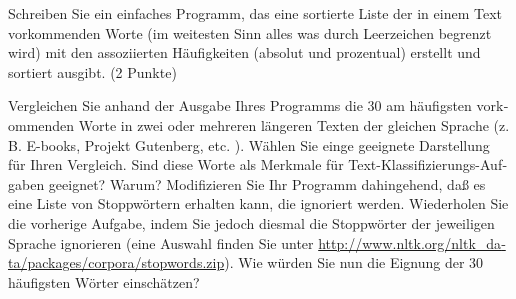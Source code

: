 Schreiben Sie ein ein­fach­es Pro­gramm, das eine sortierte Liste der in einem 
Text vork­om­menden Worte (im weitesten Sinn alles was durch Leerze­ichen 
be­gren­zt wird) mit den as­sozi­ierten Häufigkeit­en (ab­so­lut und 
prozen­tu­al) er­stellt und sortiert ausgibt.​ (2 Punk­te)

    Ver­gle­ichen Sie an­hand der Aus­gabe Ihres Pro­gramms die 30 am 
häufig­sten vork­om­menden Worte in zwei oder mehreren längeren Tex­ten der 
gle­ichen Sprache (z.​ B.​ E-books, Pro­jekt Guten­berg, etc.​ ).​ Wählen Sie 
einge geeignete Darstel­lung für Ihren Ver­gle­ich.
    Sind diese Worte als Merk­male für Text-Klas­si­fizierungs-Auf­gaben 
geeignet? Warum?
    Mod­i­fizieren Sie Ihr Pro­gramm dahinge­hend, daß es eine Liste von 
Stop­pwörtern er­hal­ten kann, die ig­nori­ert werden.​ Wieder­holen Sie die 
vorherige Auf­gabe, indem Sie je­doch dies­mal die Stop­pwörter der 
jew­eili­gen 
Sprache ig­nori­eren (eine Auswahl find­en Sie unter 
\url{http://​www.​nltk.​org/​nltk_­da­ta/pack­ages/cor­po­ra/stopwords.​zip}).
    Wie würden Sie nun die Eig­nung der 30 häufig­sten Wörter ein­schätzen?